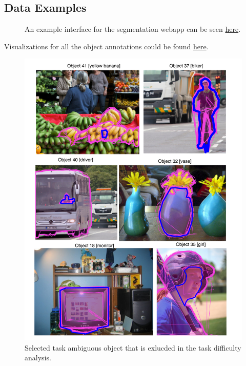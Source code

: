 \documentclass[12pt]{article}
\begin{document}
\begin{appendices}
\newpage
\section{Data Examples}
\begin{figure}[ht!]
\centering
{}
\caption{An example interface for the segmentation webapp can be seen  \href{http://crowd-segment.herokuapp.com/segment/COCO_train2014_000000000127/10/}{here}.}
\label{interface}
\end{figure}
Visualizations for all the object annotations could be found \href{http://nbviewer.jupyter.org/github/dorisjlee/crowd-seg/blob/master/analysis/2017_01_16_Visualize_all_bb_results.ipynb}{here}.
\begin{figure}[ht]
\centering
\includegraphics[width=\linewidth]{plots/task_ambiguous_cases.pdf}
\caption{Selected task ambiguous object that is exlucded in the task difficulty analysis. }
\end{figure}

\end{appendices}
\end{document}
